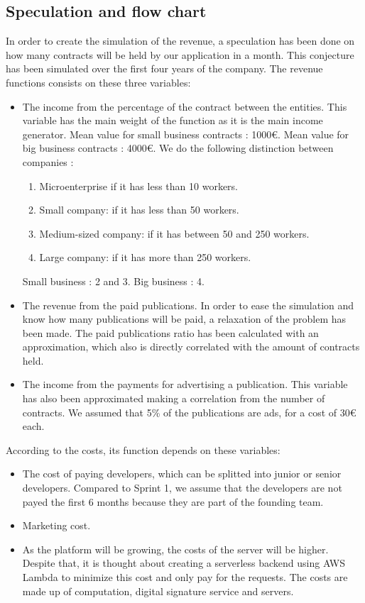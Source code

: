 \documentclass[./main.tex]{subfiles}
\begin{document}
\subsection{Speculation and flow chart}
In order to create the simulation of the revenue, a speculation has been done on how many contracts will be held by our application in a month. This conjecture has been simulated over the first four years of the company. The revenue functions consists on these three variables:
\begin{itemize}
	\item The income from the percentage of the contract between the entities. This variable has the main weight of the function as it is the main income generator. Mean value for small business contracts : 1000€. Mean value for big business contracts : 4000€. We do the following distinction between companies : 
\begin{enumerate}
    \item Microenterprise if it has less than 10 workers.
    \item Small company: if it has less than 50 workers.
    \item Medium-sized company: if it has between 50 and 250 workers.
    \item Large company: if it has more than 250 workers.
\end{enumerate}
Small business : 2 and 3. Big business : 4.

	\item The revenue from the paid publications. In order to ease the simulation and know how many publications will be paid, a relaxation of the problem has been made. The paid publications ratio has been calculated with an approximation, which also is directly correlated with the amount of contracts held.
	\item The income from the payments for advertising a publication. This variable has also been approximated making a correlation from the number of contracts. We assumed that 5\% of the publications are ads, for a cost of 30€ each.
\end{itemize}
According to the costs, its function depends on these variables:
\begin{itemize}
	\item The cost of paying developers, which can be splitted into junior or senior developers. Compared to Sprint 1, we assume that the developers are not payed the first 6 months because they are part of the founding team.
	\item Marketing cost. 
	\item As the platform will be growing, the costs of the server will be higher. Despite that, it is thought about creating a serverless backend using AWS Lambda to minimize this cost and only pay for the requests. The costs are made up of computation, digital signature service and servers.

\end{itemize}
\end{document}
